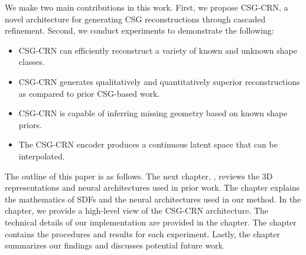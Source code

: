 We make two main contributions in this work. First, we propose CSG-CRN, a novel architecture for generating CSG reconstructions through cascaded refinement. Second, we conduct experiments to demonstrate the following:

\begin{itemize}
	\item CSG-CRN can efficiently reconstruct a variety of known and unknown shape classes.
	\item CSG-CRN generates qualitatively and quantitatively superior reconstructions as compared to prior CSG-based work.
	\item CSG-CRN is capable of inferring missing geometry based on known shape priors.
	\item The CSG-CRN encoder produces a continuous latent space that can be interpolated.
\end{itemize}

\vspace{1em}

The outline of this paper is as follows. The next chapter, , reviews the 3D representations and neural architectures used in prior work. The  chapter explains the mathematics of SDFs and the neural architectures used in our method. In the  chapter, we provide a high-level view of the CSG-CRN architecture. The technical details of our implementation are provided in the  chapter. The  chapter contains the procedures and results for each experiment. Lastly, the  chapter summarizes our findings and discusses potential future work.
